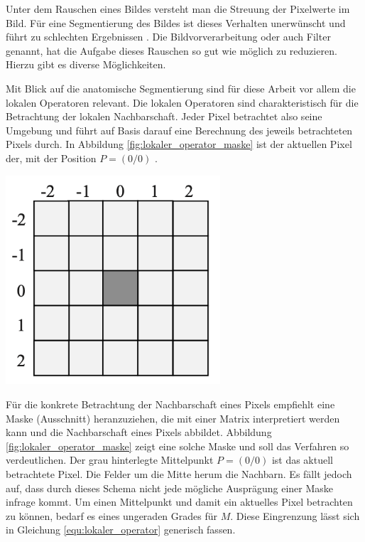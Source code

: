 Unter dem Rauschen eines Bildes versteht man die Streuung der Pixelwerte im Bild.
Für eine Segmentierung des Bildes ist dieses Verhalten unerwünscht und führt zu
schlechten Ergebnissen \citep[vgl.][S.~51]{handels2000}. Die Bildvorverarbeitung
oder auch Filter genannt, hat die Aufgabe dieses Rauschen so gut wie möglich zu reduzieren.
Hierzu gibt es diverse Möglichkeiten.

\begin{minipage}{0.40\textwidth}
	Mit Blick auf die anatomische Segmentierung sind für diese Arbeit vor allem die
	lokalen Operatoren relevant. Die lokalen Operatoren sind charakteristisch für
	die Betrachtung der lokalen Nachbarschaft. Jeder Pixel betrachtet also seine Umgebung
	und führt auf Basis darauf eine Berechnung des jeweils betrachteten Pixels durch.
	In Abbildung \ref{fig:lokaler_operator_maske} ist der aktuellen Pixel der, mit
	der Position $P = (0/0)$ \citep[vgl.][S.~52]{handels2000}.
\end{minipage}
\hfill
\begin{minipage}{0.50\textwidth}
	\centering
	\includegraphics[width=0.60\textwidth]{img/lokaler_operator_maske.jpg}
	\label{fig:lokaler_operator_maske}
\end{minipage}

Für die konkrete Betrachtung der Nachbarschaft eines Pixels empfiehlt \citet[S.~52]{handels2000}
eine Maske (Ausschnitt) heranzuziehen, die mit einer Matrix interpretiert werden
kann und die Nachbarschaft eines Pixels abbildet. Abbildung
\ref{fig:lokaler_operator_maske} zeigt eine solche Maske und soll das Verfahren
so verdeutlichen. Der grau hinterlegte Mittelpunkt $P = (0/0)$ ist das aktuell betrachtete
Pixel. Die Felder um die Mitte herum die Nachbarn. Es fällt jedoch auf, dass
durch dieses Schema nicht jede mögliche Ausprägung einer Maske infrage kommt. Um
einen Mittelpunkt und damit ein aktuelles Pixel betrachten zu können, bedarf es
eines ungeraden Grades für $M$. Diese Eingrenzung lässt sich in Gleichung \ref{equ:lokaler_operator}
generisch fassen.

